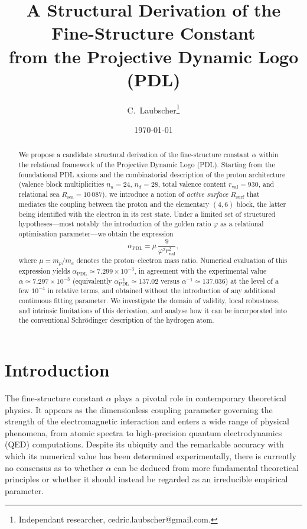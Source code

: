\documentclass[11pt,a4paper]{article}
\title{
  A Structural Derivation of the Fine-Structure Constant \\
  from the Projective Dynamic Logo (PDL)
}
\author{
  C.~Laubscher\thanks{Independant researcher, cedric.laubscher@gmail.com.}
}
\date{\today}
\theoremstyle{plain}
\theoremstyle{definition}
\theoremstyle{remark}
\begin{document}
\maketitle

\begin{abstract}
We propose a candidate structural derivation of the fine-structure constant
\(\alpha\) within the relational framework of the Projective Dynamic Logo (PDL). Starting from the foundational PDL axioms and the combinatorial description of the proton architecture (valence block multiplicities \(n_u = 24\), \(n_d = 28\), total valence content \(r_{\mathrm{val}} = 930\), and relational sea \(R_{\mathrm{sea}} = 10\,087\)), we introduce a notion of \emph{active surface} \(R_{\mathrm{surf}}\) that mediates the coupling between the proton and the elementary \((4,6)\) block, the latter being identified with the electron in its rest state. Under a limited set of structured hypotheses—most notably the introduction of the golden ratio \(\varphi\) as a relational optimisation parameter—we obtain the expression
\[
\alpha_{\mathrm{PDL}} = \mu\,\frac{9}{\varphi^2 r_{\mathrm{val}}^2},
\]
where \(\mu = m_p/m_e\) denotes the proton–electron mass ratio. Numerical evaluation of this expression yields \(\alpha_{\mathrm{PDL}} \simeq 7.299 \times 10^{-3}\), in agreement with the experimental value \(\alpha \simeq 7.297 \times 10^{-3}\) (equivalently \(\alpha_{\mathrm{PDL}}^{-1} \simeq 137.02\) versus \(\alpha^{-1} \simeq 137.036\)) at the level of a few \(10^{-4}\) in relative terms, and obtained without the introduction of any additional continuous fitting parameter. We investigate the domain of validity, local robustness, and intrinsic limitations of this derivation, and analyse how it can be incorporated into the conventional Schrödinger description of the hydrogen atom.
\end{abstract}

\section{Introduction}

The fine-structure constant \(\alpha\) plays a pivotal role in contemporary theoretical physics. It appears as the dimensionless coupling parameter governing the strength of the electromagnetic interaction and enters a wide range of physical phenomena, from atomic spectra to high-precision quantum electrodynamics (QED) computations. Despite its ubiquity and the remarkable accuracy with which its numerical value has been determined experimentally, there is currently no consensus as to whether \(\alpha\) can be deduced from more fundamental theoretical principles or whether it should instead be regarded as an irreducible empirical parameter.
\end{document}
